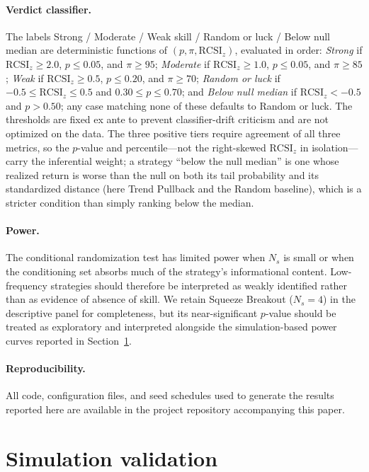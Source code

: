 \documentclass[preprint,12pt]{elsarticle}
\theoremstyle{definition}
\begin{document}
\paragraph{Verdict classifier.} The labels Strong / Moderate / Weak skill / Random or luck / Below null median are deterministic functions of $(p, \pi, \mathrm{RCSI}_z)$, evaluated in order: \emph{Strong} if $\mathrm{RCSI}_z \ge 2.0$, $p\le 0.05$, and $\pi\ge 95$; \emph{Moderate} if $\mathrm{RCSI}_z\ge 1.0$, $p\le 0.05$, and $\pi\ge 85$; \emph{Weak} if $\mathrm{RCSI}_z\ge 0.5$, $p\le 0.20$, and $\pi\ge 70$; \emph{Random or luck} if $-0.5\le\mathrm{RCSI}_z\le 0.5$ and $0.30\le p\le 0.70$; and \emph{Below null median} if $\mathrm{RCSI}_z<-0.5$ and $p>0.50$; any case matching none of these defaults to Random or luck. The thresholds are fixed ex ante to prevent classifier-drift criticism and are not optimized on the data. The three positive tiers require agreement of all three metrics, so the $p$-value and percentile---not the right-skewed $\mathrm{RCSI}_z$ in isolation---carry the inferential weight; a strategy ``below the null median'' is one whose realized return is worse than the null on both its tail probability and its standardized distance (here Trend Pullback and the Random baseline), which is a stricter condition than simply ranking below the median.

\paragraph{Power.} The conditional randomization test has limited power when $N_s$ is small or when the conditioning set absorbs much of the strategy's informational content. Low-frequency strategies should therefore be interpreted as weakly identified rather than as evidence of absence of skill. We retain Squeeze Breakout ($N_s=4$) in the descriptive panel for completeness, but its near-significant $p$-value should be treated as exploratory and interpreted alongside the simulation-based power curves reported in Section~\ref{sec:simulation-validation}.

\paragraph{Reproducibility.} All code, configuration files, and seed schedules used to generate the results reported here are available in the project repository accompanying this paper.

\section{Simulation validation}
\label{sec:simulation-validation}
\end{document}
